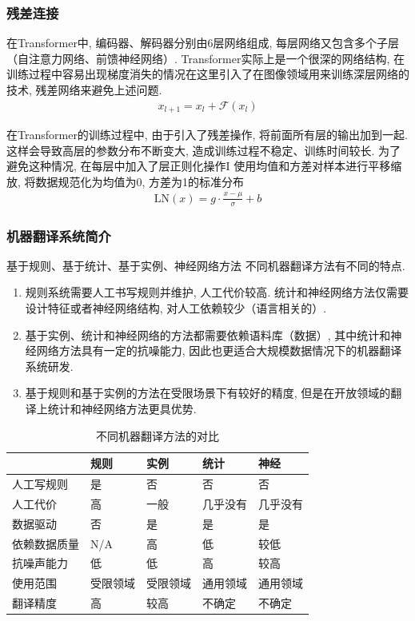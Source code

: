 \subsubsection{残差连接}
在Transformer中, 编码器、解码器分别由6层网络组成, 每层网络又包含多个子层（自注意力网络、前馈神经网络）. Transformer实际上是一个很深的网络结构, 在训练过程中容易出现梯度消失的情况在这里引入了在图像领域用来训练深层网络的技术, 残差网络来避免上述问题.
\begin{eqnarray}
    x_{l+1} = x_l + \mathcal{F} (x_l)
    \end{eqnarray}

    在Transformer的训练过程中, 由于引入了残差操作, 将前面所有层的输出加到一起. 这样会导致高层的参数分布不断变大, 造成训练过程不稳定、训练时间较长. 为了避免这种情况, 在每层中加入了层正则化操作I 使用均值和方差对样本进行平移缩放, 将数据规范化为均值为0, 方差为1的标准分布
    \begin{eqnarray}
        \textrm{LN}(x) = g \cdot \frac{x- \mu} {\sigma} + b
        \end{eqnarray}  


\subsubsection{机器翻译系统简介}


基于规则、基于统计、基于实例、神经网络方法
不同机器翻译方法有不同的特点.  
\begin{enumerate}
    \item 规则系统需要人工书写规则并维护, 人工代价较高. 统计和神经网络方法仅需要设计特征或者神经网络结构, 对人工依赖较少（语言相关的）. 
    \item 基于实例、统计和神经网络的方法都需要依赖语料库（数据）, 其中统计和神经网络方法具有一定的抗噪能力, 因此也更适合大规模数据情况下的机器翻译系统研发. 
    \item  基于规则和基于实例的方法在受限场景下有较好的精度, 但是在开放领域的翻译上统计和神经网络方法更具优势. 
\end{enumerate}

\begin{table}  [!htb]
    \Large  
    \caption{不同机器翻译方法的对比}  
    \begin{center}  
    \begin{tabular}{l|lll l}  
    \hline  
    &规则&实例&统计&神经 \\ \hline
    人工写规则&是&否&否&否\\ 
    人工代价&高&一般&几乎没有&几乎没有\\ 
    数据驱动&否&是&是&是\\ 
    依赖数据质量&N/A&高&低&较低\\ 
    抗噪声能力&低&低&高&较高\\ 
    使用范围&受限领域&受限领域&通用领域&通用领域\\ 
    翻译精度&高&较高&不确定&不确定\\  
    \hline  
    \end{tabular}  
    \end{center}  
    \end{table}

